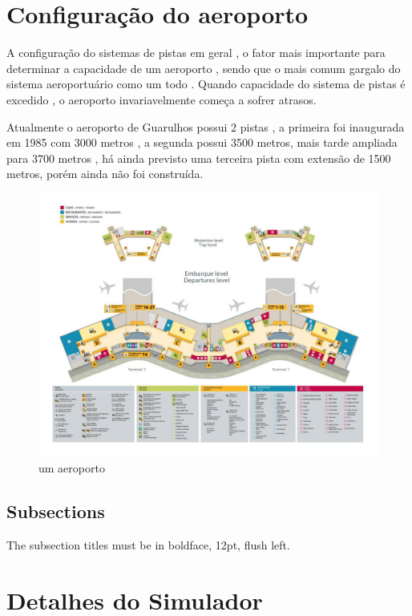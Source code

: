 \documentclass[12pt]{article}
\begin{document}
\section{Configuração do aeroporto}

A configuração do sistemas de pistas  em geral , o fator mais importante
para determinar a capacidade de um aeroporto , sendo que o mais comum 
gargalo do sistema aeroportuário como um todo . Quando capacidade do 
sistema de pistas é excedido , o aeroporto invariavelmente começa a 
sofrer atrasos.

Atualmente o aeroporto de Guarulhos possui 2 pistas , a primeira foi 
inaugurada em 1985 com  3000 metros , a segunda possui 3500 metros, 
mais tarde ampliada para 3700 metros , há ainda previsto uma terceira
pista com extensão de 1500 metros, porém ainda não foi construída. 

\begin{figure}[ht]
  \centering
  \includegraphics[width=.9\textwidth]{aeroporto.png}
  \caption{um aeroporto}
  \label{fig:exampleFig1}
\end{figure}


\subsection{Subsections}

The subsection titles must be in boldface, 12pt, flush left.

\section{Detalhes do Simulador}\label{sec:simulador}
\end{document}
